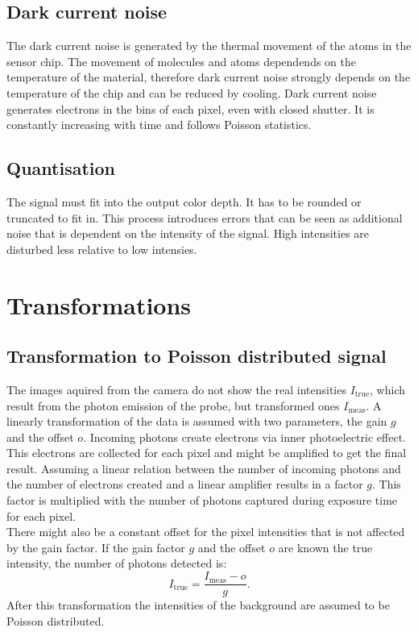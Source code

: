 \subsection{Dark current noise}
The dark current noise is generated by the thermal movement of the atoms in the sensor chip. The movement of molecules and atoms dependends on the temperature of the material, therefore dark current noise strongly depends on the temperature of the chip and can be reduced by cooling. Dark current noise generates electrons in the bins of each pixel, even with closed shutter. It is constantly increasing with time and follows Poisson statistics.
\subsection{Quantisation}
The signal must fit into the output color depth. It has to be rounded or truncated to fit in. This process introduces errors that can be seen as additional noise that is dependent on the intensity of the signal. High intensities are disturbed less relative to low intensies.


\section{Transformations}
\subsection{Transformation to Poisson distributed signal} \label{trafoPoiss}
The images aquired from the camera do not show the real intensities
$I_\text{true}$, which result from the photon emission of the probe, but
transformed ones $I_\text{meas}$.\newline
A linearly transformation of the data is assumed with two parameters, the gain $g$ and the offset $o$.
Incoming photons create electrons via inner photoelectric effect. This electrons
are collected for each pixel and might be amplified to get the final result.
Assuming a linear relation between the number of incoming photons and the number
of electrons created and a linear amplifier results in a factor $g$. This factor
is multiplied with the number of photons captured during exposure time for each
pixel.\\
There might also be a constant offset for the pixel intensities that is not affected by the gain factor.
If the gain factor $g$ and the offset $o$ are known the true intensity, the
number of photons detected is:
\begin{equation}
	I_\text{true} = \dfrac{I_\text{meas}-o}{g}. \label{transtopoiss}
\end{equation}
After this transformation the intensities of the background are assumed to be Poisson distributed.
